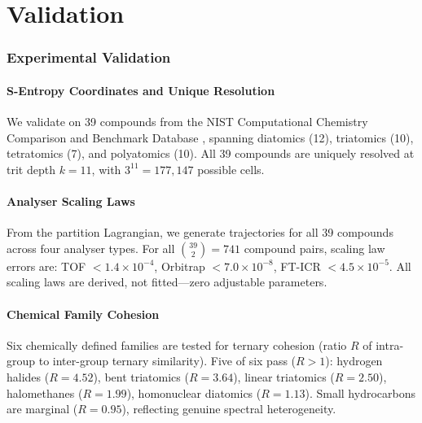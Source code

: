 \documentclass[11pt,twocolumn,a4paper]{article}
\theoremstyle{definition}
\theoremstyle{remark}
\begin{document}

\part{Validation}

\section{Experimental Validation}
\label{sec:validation}

\subsection{S-Entropy Coordinates and Unique Resolution}

We validate on 39 compounds from the NIST Computational Chemistry Comparison and Benchmark Database \citep{johnson2022}, spanning diatomics (12), triatomics (10), tetratomics (7), and polyatomics (10). All 39 compounds are uniquely resolved at trit depth $k = 11$, with $3^{11} = 177{,}147$ possible cells.

\subsection{Analyser Scaling Laws}

From the partition Lagrangian, we generate trajectories for all 39 compounds across four analyser types. For all $\binom{39}{2} = 741$ compound pairs, scaling law errors are: TOF $< 1.4 \times 10^{-4}$, Orbitrap $< 7.0 \times 10^{-8}$, FT-ICR $< 4.5 \times 10^{-5}$. All scaling laws are derived, not fitted---zero adjustable parameters.

\subsection{Chemical Family Cohesion}

Six chemically defined families are tested for ternary cohesion (ratio $R$ of intra-group to inter-group ternary similarity). Five of six pass ($R > 1$): hydrogen halides ($R = 4.52$), bent triatomics ($R = 3.64$), linear triatomics ($R = 2.50$), halomethanes ($R = 1.99$), homonuclear diatomics ($R = 1.13$). Small hydrocarbons are marginal ($R = 0.95$), reflecting genuine spectral heterogeneity.
\end{document}
